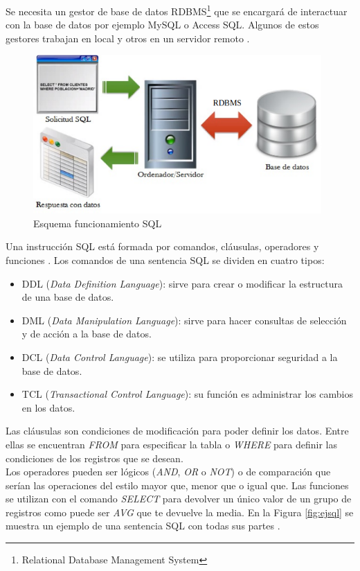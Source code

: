 Se necesita un gestor de base de datos RDBMS\footnote{Relational Database Management System}  que se encargará de interactuar con la base de datos por ejemplo MySQL o  Access SQL. Algunos de estos gestores trabajan en local y otros en un servidor remoto \cite{rdbms}.\\

\begin{figure}[H]
    \centering
    \includegraphics[width=11cm, keepaspectratio]{img/sql.png}
    \caption{Esquema funcionamiento SQL}
    \label{fig:sql}
\end{figure}
Una instrucción SQL está formada por comandos, cláusulas, operadores y funciones . Los comandos de una sentencia SQL se dividen en cuatro tipos:
\begin{itemize}
\item DDL (\textit{Data Definition Language}): sirve para crear o modificar la estructura de una base de datos. 
\item DML (\textit{Data Manipulation Language}): sirve para hacer consultas de selección y de acción a la base de datos. 
\item DCL (\textit{Data Control Language}): se utiliza para proporcionar seguridad a la base de datos. 
\item TCL (\textit{Transactional Control Language}): su función es administrar los cambios en los datos. 
\end{itemize}

Las cláusulas son condiciones de modificación para poder definir los datos. Entre ellas se encuentran \textit{FROM} para especificar la tabla o \textit{WHERE} para definir las condiciones de los registros que se desean.\\

Los operadores pueden ser lógicos (\textit{AND}, \textit{OR} o \textit{NOT}) o de comparación que serían las operaciones del estilo mayor que, menor que o igual que. Las funciones se utilizan con el comando \textit{SELECT} para devolver un único valor de un grupo de registros como puede ser\textit{ AVG }que te devuelve la media. En la Figura \ref{fig:ejsql} se muestra un ejemplo de una sentencia SQL con todas sus partes \cite{sql}.\\

